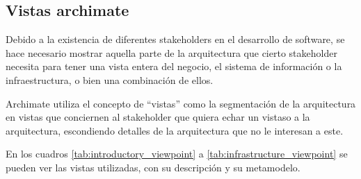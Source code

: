 \begin{itemize}
\begin{table}
\begin{center}
    \end{center}
\end{table}

\end{itemize}

\subsection{Vistas archimate}

Debido a la existencia de diferentes stakeholders en el desarrollo de software, se hace necesario mostrar aquella parte de la arquitectura que cierto stakeholder necesita para tener una vista entera del negocio, el sistema de información o la infraestructura, o bien una combinación de ellos.

Archimate utiliza el concepto de “vistas” como la segmentación de la arquitectura en vistas que conciernen al stakeholder que quiera echar un vistaso a la arquitectura, escondiendo detalles de la arquitectura que no le interesan a este.

En los cuadros \ref{tab:introductory_viewpoint} a \ref{tab:infrastructure_viewpoint} se pueden ver las vistas utilizadas, con su descripción y su metamodelo.

